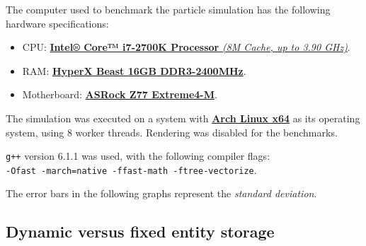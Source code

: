 \documentclass[twoside, 12pt, a4paper, openany]{book}
\begin{document}
The computer used to benchmark the particle simulation has the following
hardware specifications:

\begin{itemize}
\item
  CPU:
  \href{http://ark.intel.com/products/61275/Intel-Core-i7-2700K-Processor-8M-Cache-up-to-3_90-GHz}{\textbf{Intel®
  Core™ i7-2700K Processor} \emph{(8M Cache, up to 3.90 GHz)}}.
\item
  RAM: \href{http://www.hyperxgaming.com/us/memory/beast}{\textbf{HyperX
  Beast 16GB DDR3-2400MHz}}.
\item
  Motherboard:
  \href{http://www.asrock.com/mb/intel/z77\%20extreme4-m/}{\textbf{ASRock
  Z77 Extreme4-M}}.
\end{itemize}

The simulation was executed on a system with
\href{https://www.archlinux.org/}{\textbf{Arch Linux x64}} as its
operating system, using \(8\) worker threads. Rendering was disabled for
the benchmarks.

\texttt{g++}
version 6.1.1 was used, with the following compiler flags:\\
\texttt{-Ofast -march=native -ffast-math -ftree-vectorize}.

The error bars in the following graphs represent the \emph{standard
deviation}.

\subsection{Dynamic versus fixed entity
storage}\label{dynamic-versus-fixed-entity-storage}
\end{document}
